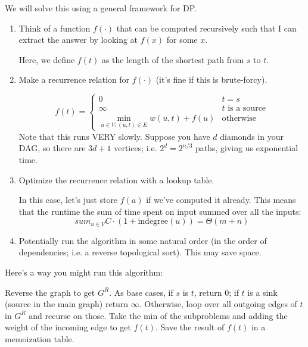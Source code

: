 We will solve this using a general framework for DP.
\begin{enumerate}
    \item Think of a function $f(\cdot)$ that can be computed recursively such that I can extract the answer by looking at
    $f(x)$ for some $x$.

    Here, we define $f(t)$ as the length of the shortest path from $s$ to $t$.

    \item Make a recurrence relation for $f(\cdot)$ (it's fine if this is brute-forcy).
    
    \[ f(t) = \begin{cases}
        0 & t = s \\
        \infty & \text{$t$ is a source} \\
        \min_{u\in V: (u, t) \in E} w(u, t) + f(u) & \text{otherwise}
    \end{cases}\]    
    Note that this runs VERY slowly. Suppose you have $d$ diamonds in your DAG, so there are $3d + 1$ vertices; i.e. $2^d = 2^{n/3}$ paths, giving us exponential time.

    \item Optimize the recurrence relation with a lookup table. 
    
    In this case, let's just store $f(a)$ if we've computed it already. This means that the runtime the sum of time spent on input summed over all the inputs:
    \[ sum_{u \in V} C \cdot (1 + \text{indegree}(u)) = \Theta(m + n) \]

    \item Potentially run the algorithm in some natural order (in the order of dependencies; i.e. a reverse topological sort).
    This may save space.
\end{enumerate}

Here's a way you might run this algorithm:
\begin{algothm}
    Reverse the graph to get $G^R$.
    As base cases, if $s$ is $t$, return 0; if $t$ is a sink (source in the main graph) return $\infty$.
    Otherwise, loop over all outgoing edges of $t$ in $G^R$ and recurse on those. Take the min of the subproblems and adding the weight of the incoming edge to get $f(t)$.
    Save the result of $f(t)$ in a memoization table.
\end{algothm}